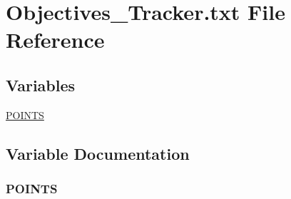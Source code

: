 \hypertarget{Objectives__Tracker_8txt}{}\section{Objectives\+\_\+\+Tracker.\+txt File Reference}
\label{Objectives__Tracker_8txt}
\subsection*{Variables}
\begin{DoxyCompactItemize}
\item 
\hyperlink{Objectives__Tracker_8txt_a1216cbbb1a8d8b09acd28f37d4d415fe}{P\+O\+I\+N\+TS}
\end{DoxyCompactItemize}


\subsection{Variable Documentation}
\subsubsection[{\texorpdfstring{P\+O\+I\+N\+TS}{POINTS}}]{\setlength{\rightskip}{0pt plus 5cm}P\+O\+I\+N\+TS}\hypertarget{Objectives__Tracker_8txt_a1216cbbb1a8d8b09acd28f37d4d415fe}{}\label{Objectives__Tracker_8txt_a1216cbbb1a8d8b09acd28f37d4d415fe}
